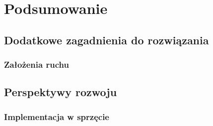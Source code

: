 \section{Podsumowanie}

\subsection{Dodatkowe zagadnienia do rozwiązania}

\begin{frame}
    \frametitle{Założenia ruchu}
\end{frame}

\subsection{Perspektywy rozwoju}

\begin{frame}
    \frametitle{Implementacja w sprzęcie}
\end{frame}